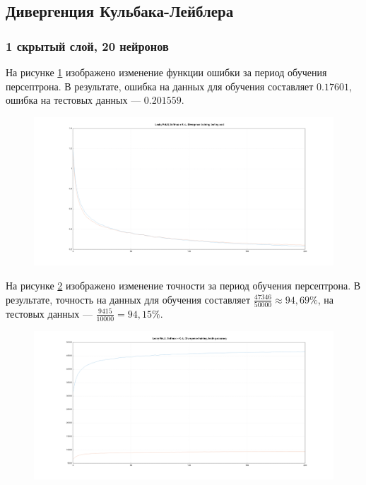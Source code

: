 \documentclass[a4paper, 14pt]{extarticle}
\begin{document}
\subsection{Дивергенция Кульбака-Лейблера}

\subsubsection{1 скрытый слой, 20 нейронов}


На рисунке \ref{fig:1_20_leaky_relu_softmax_kl_divergence_cost} изображено изменение функции ошибки за период обучения персептрона.
В результате, ошибка на данных для обучения составляет $0.17601$, ошибка на тестовых данных --- $0.201559$.

\begin{figure}[!htb]
  \centering\includegraphics[width=\textwidth]{images/1_20_leaky_relu_softmax_kl_divergence_cost.png}
  \caption{}
  \label{fig:1_20_leaky_relu_softmax_kl_divergence_cost}
\end{figure}

На рисунке \ref{fig:1_20_leaky_relu_softmax_kl_divergence_accuracy} изображено изменение точности за период обучения персептрона.
В результате, точность на данных для обучения составляет $\frac{47346}{50000} \approx 94,69\%$, на тестовых данных --- $\frac{9415}{10000} = 94,15\%$.

\begin{figure}[!htb]
  \centering\includegraphics[width=\textwidth]{images/1_20_leaky_relu_softmax_kl_divergence_accuracy.png}
  \caption{}
  \label{fig:1_20_leaky_relu_softmax_kl_divergence_accuracy}
\end{figure}
\end{document}
